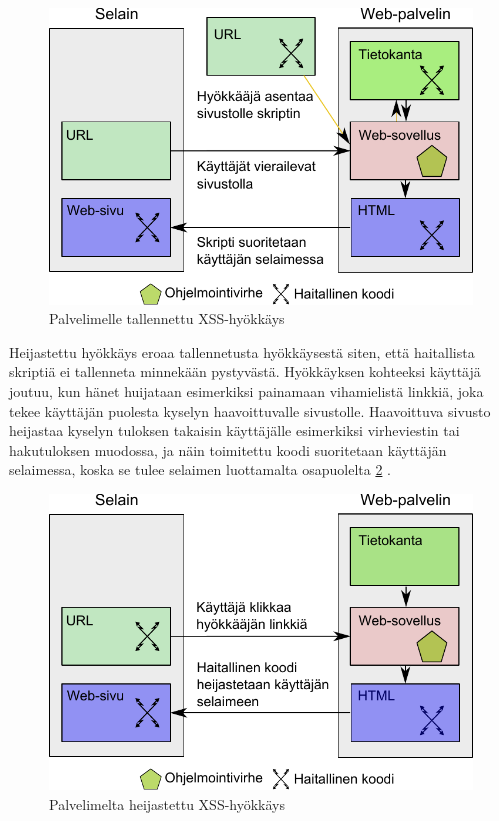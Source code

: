 \begin{figure}[htp]
\centering
\includegraphics[width=12cm]{pics/tallennettu.pdf}
\caption{Palvelimelle tallennettu XSS-hyökkäys}
\label{tallennettu}
\end{figure}

\newpage
Heijastettu hyökkäys eroaa tallennetusta hyökkäysestä siten, että haitallista skriptiä ei tallenneta minnekään pystyvästä. Hyökkäyksen kohteeksi käyttäjä joutuu, kun 
hänet huijataan esimerkiksi painamaan vihamielistä linkkiä, joka tekee käyttäjän puolesta kyselyn haavoittuvalle sivustolle. Haavoittuva sivusto heijastaa kyselyn tuloksen 
takaisin käyttäjälle esimerkiksi virheviestin tai hakutuloksen muodossa, ja näin toimitettu koodi suoritetaan käyttäjän selaimessa, koska se tulee selaimen luottamalta
osapuolelta \ref{heijastettu} \cite{WEB2}.

\begin{figure}[htp]
\centering
\includegraphics[width=12cm]{pics/heijastettu.pdf}
\caption{Palvelimelta heijastettu XSS-hyökkäys}
\label{heijastettu}
\end{figure}

